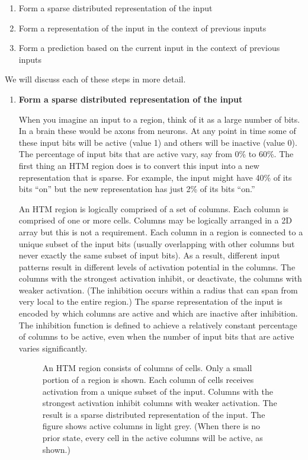 \begin{enumerate}
\item Form a sparse distributed representation of the input
\item Form a representation of the input in the context of previous
  inputs
\item Form a prediction based on the current input in the context of
  previous inputs
\end{enumerate}

We will discuss each of these steps in more detail.

\begin{enumerate}
\item {\bf Form a sparse distributed representation of the input}

When you imagine an input to a region, think of it as a large number
of bits. In a brain these would be axons from neurons. At any point in
time some of these input bits will be active (value 1) and others will
be inactive (value 0). The percentage of input bits that are active
vary, say from 0\% to 60\%. The first thing an HTM region does is to
convert this input into a new representation that is sparse. For
example, the input might have 40\% of its bits ``on'' but the new
representation has just 2\% of its bits ``on.''

An HTM region is logically comprised of a set of columns. Each column
is comprised of one or more cells. Columns may be logically arranged
in a 2D array but this is not a requirement. Each column in a region
is connected to a unique subset of the input bits (usually overlapping
with other columns but never exactly the same subset of input
bits). As a result, different input patterns result in different
levels of activation potential in the columns. The columns with the strongest
activation inhibit, or deactivate, the columns with weaker
activation. (The inhibition occurs within a radius that can span from
very local to the entire region.) The sparse representation of the
input is encoded by which columns are active and which are inactive
after inhibition. The inhibition function is defined to achieve a
relatively constant percentage of columns to be active, even when the
number of input bits that are active varies significantly.

\begin{figure}
\caption{An HTM region consists of columns of cells. Only a small
  portion of a region is shown. Each column of cells receives
  activation from a unique subset of the input. Columns with the
  strongest activation inhibit columns with weaker activation. The
  result is a sparse distributed representation of the input. The
  figure shows active columns in light grey. (When there is no prior
  state, every cell in the active columns will be active, as shown.)}
\label{figure:region-columns}
\end{figure}


\end{enumerate}
